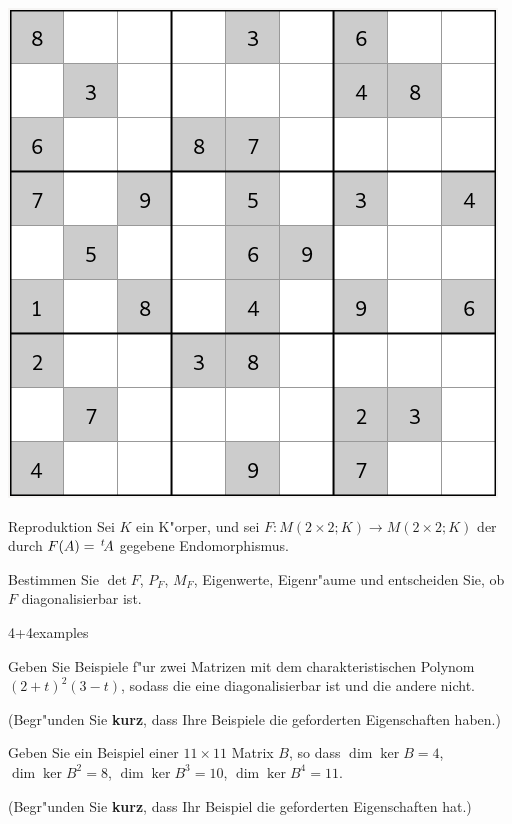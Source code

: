 \documentclass[a4paper]{article}
\begin{document}
\vspace{5mm}

\begin{center}
\includegraphics[width=.5\textwidth]{sudoku}
\end{center}

\newpage


\begin{klaufg}{8}{Reproduktion}
  Sei $K$ ein K"orper, und sei $F \colon M(2 \times 2;K) \to M(2
  \times 2;K)$ der durch $F(A) = \,^t\!A$ gegebene
  Endomorphismus.

  Bestimmen Sie $\det F$, $P_F$, $M_F$, Eigenwerte, Eigenr"aume und
  entscheiden Sie, ob $F$ diagonalisierbar ist.
\end{klaufg}

\pagebreak
\begin{klaufg}{4+4}{examples}

  Geben Sie Beispiele f"ur zwei Matrizen mit dem charakteristischen Polynom
  $(2+t)^2(3-t)$, sodass die eine diagonalisierbar ist und die andere
  nicht.

  (Begr"unden Sie {\bfseries\sffamily kurz}, dass Ihre Beispiele die
  geforderten Eigenschaften haben.)
  \pagebreak
  
  Geben Sie ein Beispiel einer $11 \times 11$ Matrix $B$, so dass
  $\dim \ker B = 4$, $\dim \ker B^2 = 8$, $\dim \ker B^3 = 10$,
  $\dim \ker B^4 = 11$.
  
  (Begr"unden Sie {\bfseries\sffamily kurz}, dass Ihr Beispiel die
  geforderten Eigenschaften hat.)
\end{klaufg}
\end{document}

